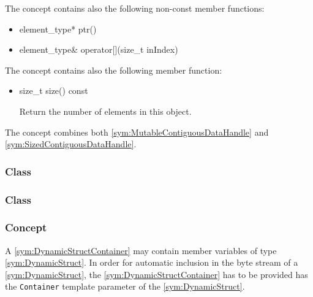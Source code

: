 The concept  contains also the following non-const member functions:
%
\begin{itemize}
	\item
		\begin{cppsnippet}
		element_type* ptr()
		\end{cppsnippet}

	\item
		\begin{cppsnippet}
		element_type& operator[](size_t inIndex)
		\end{cppsnippet}
\end{itemize}
%
The concept  contains also the following member function:
%
\begin{itemize}
	\item
		\begin{cppsnippet}
		size_t size() const
		\end{cppsnippet}
		
		Return the number of elements in this object.
\end{itemize}
%
The concept  combines both \ref{sym:MutableContiguousDataHandle} and \ref{sym:SizedContiguousDataHandle}.

\subsubsection[Class ByteStream]{Class }

\subsubsection[Class ByteStreamHandleBuf]{Class }


\subsubsection[Concept DynamicStructContainer]{Concept }

A \ref{sym:DynamicStructContainer} may contain member variables of type \ref{sym:DynamicStruct}. In order for automatic inclusion in the byte stream of a \ref{sym:DynamicStruct}, the \ref{sym:DynamicStructContainer} has to be provided has the \texttt{Container} template parameter of the \ref{sym:DynamicStruct}.

